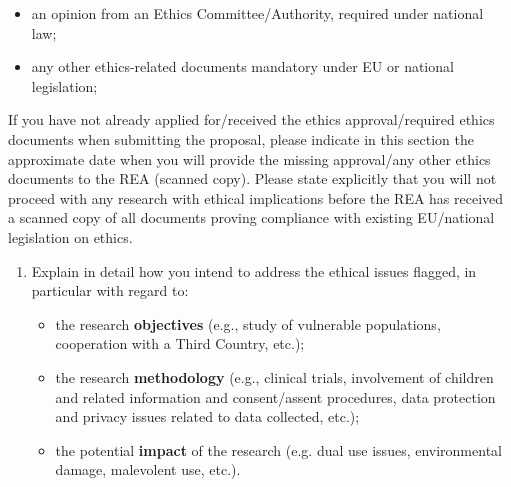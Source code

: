 \begin{itemize}
  \item an opinion from an Ethics Committee/Authority, required under national law;
  \item any other ethics-related documents mandatory under EU or national legislation;
\end{itemize}

\medskip\noindent
If you have not already applied for/received the ethics approval/required ethics documents when submitting the proposal, 
please indicate in this section the approximate date when you will provide the missing approval/any other ethics documents to the REA (scanned copy). 
Please state explicitly that you will not proceed with any research with ethical implications before the REA has received a scanned copy of all documents proving compliance with existing EU/national legislation on ethics.

\medskip\noindent
{}

\bigskip
{\bf 
\begin{enumerate}[resume, start=2]
  \item Explain in detail how you intend to address the ethical issues flagged, in particular with regard to: 
  \begin{itemize}
    \item {\normalfont the research {\bf objectives} (e.g., study of vulnerable populations, cooperation with a Third Country, etc.);}
    \item {\normalfont the research {\bf methodology} (e.g., clinical trials, involvement of children and related information and consent/assent procedures, data protection and privacy issues related to data collected, etc.);}
    \item {\normalfont the potential {\bf impact} of the research (e.g. dual use issues, environmental damage, malevolent use, etc.).}
  \end{itemize}
\end{enumerate}
}




